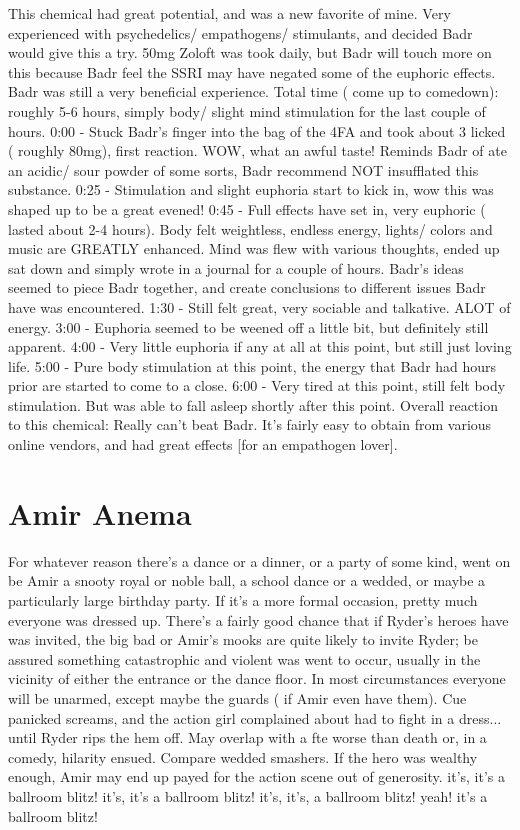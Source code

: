 \documentclass[12pt]{book}
\begin{document}
This chemical had great potential, and was a new favorite of mine. Very experienced with psychedelics/ empathogens/ stimulants, and decided Badr would give this a try. 50mg Zoloft was took daily, but Badr will touch more on this because Badr feel the SSRI may have negated some of the euphoric effects. Badr was still a very beneficial experience. Total time ( come up to comedown): roughly 5-6 hours, simply body/ slight mind stimulation for the last couple of hours. 0:00 - Stuck Badr's finger into the bag of the 4FA and took about 3 licked ( roughly 80mg), first reaction. WOW, what an awful taste! Reminds Badr of ate an acidic/ sour powder of some sorts, Badr recommend NOT insufflated this substance. 0:25 - Stimulation and slight euphoria start to kick in, wow this was shaped up to be a great evened! 0:45 - Full effects have set in, very euphoric ( lasted about 2-4 hours). Body felt weightless, endless energy, lights/ colors and music are GREATLY enhanced. Mind was flew with various thoughts, ended up sat down and simply wrote in a journal for a couple of hours. Badr's ideas seemed to piece Badr together, and create conclusions to different issues Badr have was encountered. 1:30 - Still felt great, very sociable and talkative. ALOT of energy. 3:00 - Euphoria seemed to be weened off a little bit, but definitely still apparent. 4:00 - Very little euphoria if any at all at this point, but still just loving life. 5:00 - Pure body stimulation at this point, the energy that Badr had hours prior are started to come to a close. 6:00 - Very tired at this point, still felt body stimulation. But was able to fall asleep shortly after this point. Overall reaction to this chemical: Really can't beat Badr. It's fairly easy to obtain from various online vendors, and had great effects [for an empathogen lover].



\chapter{Amir Anema}

For whatever reason there's a dance or a dinner, or a party of some kind, went on  be Amir a snooty royal or noble ball, a school dance or a wedded, or maybe a particularly large birthday party. If it's a more formal occasion, pretty much everyone was dressed up. There's a fairly good chance that if Ryder's heroes have was invited, the big bad or Amir's mooks are quite likely to invite Ryder; be assured something catastrophic and violent was went to occur, usually in the vicinity of either the entrance or the dance floor. In most circumstances everyone will be unarmed, except maybe the guards ( if Amir even have them). Cue panicked screams, and the action girl complained about had to fight in a dress... until Ryder rips the hem off. May overlap with a fte worse than death  or, in a comedy, hilarity ensued. Compare wedded smashers. If the hero was wealthy enough, Amir may end up payed for the action scene out of generosity. it's, it's a ballroom blitz! it's, it's a ballroom blitz! it's, it's, a ballroom blitz! yeah! it's a ballroom blitz!
\end{document}
